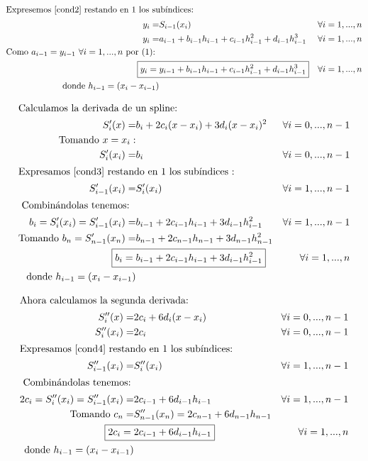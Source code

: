 \begin{align*}
\intertext{Expresemos \eqref{cond2} restando en 1 los subíndices: }
y_i = & S_{i-1}(x_i)				& \forall i=1, ..., n \\
y_i = & a_{i-1} + b_{i-1}h_{i-1} + c_{i-1}h_{i-1}^2 +  d_{i-1}h_{i-1}^3 & \forall i=1, ..., n \\
\text{Como } a_{i-1} = y_{i-1} \ \forall i=1, ..., n \text{ por (1): } \\
\Aboxed{y_i = & y_{i-1} + b_{i-1}h_{i-1} + c_{i-1}h_{i-1}^2 +  d_{i-1}h_{i-1}^3} & \forall i=1, ..., n \\
\text{donde } h_{i-1} = (x_i-x_{i-1}) \\
\end{align*}

\begin{align*}
\intertext{Calculamos la derivada de un spline: }
S'_i(x) = & b_i + 2c_i(x-x_i) + 3d_i(x-x_i)^2  & \forall i=0, ..., n-1 \\
\text{Tomando } x = x_i:  \\
S'_i(x_i) = & b_i	 & \forall i=0, ..., n-1 \\
\intertext{Expresamos \eqref{cond3} restando en 1 los subíndices : }
S'_{i-1}(x_i) = & S'_i(x_i) 	 & \forall i= 1, ..., n-1 \\
\intertext{ Combinándolas tenemos: } 
b_i =  S'_i(x_i) = S'_{i-1}(x_i) = & b_{i-1} + 2c_{i-1}h_{i-1} + 3d_{i-1}h_{i-1}^2 & \forall i=1, ..., n-1 \\
\text{Tomando } b_n =  S'_{n-1}(x_n) = & b_{n-1} + 2c_{n-1}h_{n-1} + 3d_{n-1}h_{n-1}^2 & \\
\Aboxed{b_i = & b_{i-1} + 2c_{i-1}h_{i-1} + 3d_{i-1}h_{i-1}^2} & \forall i=1, ..., n \\
\text{donde } h_{i-1} = (x_i-x_{i-1}) \\
\end{align*}

\begin{align*}
\intertext{Ahora calculamos la segunda derivada: }
S''_i(x) = & 2c_i + 6d_i(x-x_i)   & \forall i=0, ..., n-1 \\
S''_i(x_i) = & 2c_i & \forall i=0, ..., n-1 \\
\intertext{Expresamos \eqref{cond4} restando en 1 los subíndices: } 
S''_{i-1}(x_i) = & S''_i(x_i) 	 & \forall i= 1, ..., n-1 \\
\intertext{ Combinándolas tenemos: } 
2c_i =  S''_i(x_i) = S''_{i-1}(x_i) = & 2c_{i-1} + 6d_{i-1}h_{i-1}	 & \forall i= 1, ..., n-1 \\
\text{Tomando } c_n = & S''_{n-1}(x_n) = 2c_{n-1} + 6d_{n-1}h_{n-1} \\
\Aboxed{2c_i = & 2c_{i-1} + 6d_{i-1}h_{i-1}} & \forall i= 1, ..., n \\
\text{donde } h_{i-1} = (x_i-x_{i-1}) \\
\end{align*}


